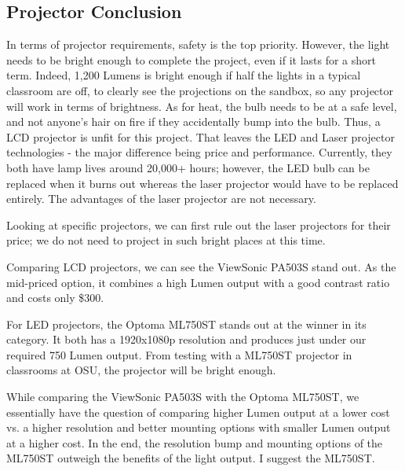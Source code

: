 \documentclass[IEEEtran]{article}
\begin{document}
\subsection{Projector Conclusion}
\par In terms of projector requirements, safety is the top priority. However, the light needs to be bright enough to complete the project, even if it lasts for a short term. Indeed, 1,200 Lumens is bright enough if half the lights in a typical classroom are off, to clearly see the projections on the sandbox, so any projector will work in terms of brightness. As for heat, the bulb needs to be at a safe level, and not anyone's hair on fire if they accidentally bump into the bulb. Thus, a LCD projector is unfit for this project. That leaves the LED and Laser projector technologies - the major difference being price and performance. Currently, they both have lamp lives around 20,000+ hours; however, the LED bulb can be replaced when it burns out whereas the laser projector would have to  be replaced entirely. The advantages of the laser projector are not necessary. 
\par Looking at specific projectors, we can first rule out the laser projectors for their price; we do not need to project in such bright places at this time.  
\par Comparing LCD projectors, we can see the ViewSonic PA503S stand out. As the mid-priced option, it combines a high Lumen output with a good contrast ratio and costs only \$300.
\par For LED projectors, the Optoma ML750ST stands out at the winner in its category. It both has a 1920x1080p resolution and produces just under our required 750 Lumen output. From testing with a ML750ST projector in classrooms at OSU, the projector will be bright enough.
\par While comparing the ViewSonic PA503S with the Optoma ML750ST, we essentially have the question of comparing higher Lumen output at a lower cost vs. a higher resolution and better mounting options with smaller Lumen output at a higher cost. In the end, the resolution bump and mounting options of the ML750ST outweigh the benefits of the light output. I suggest the ML750ST.

\newpage


\end{document}
